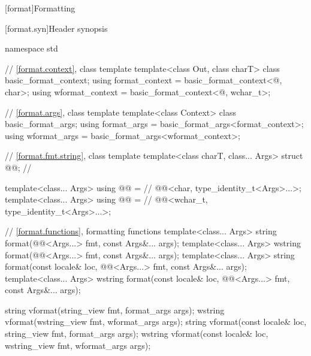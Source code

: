 
[format]{Formatting}

[format.syn]{Header  synopsis}

%
%
%
%
%
%
%
%
%
%
%
\begin{codeblock}
namespace std {
  // \ref{format.context}, class template 
  template<class Out, class charT> class basic_format_context;
  using format_context = basic_format_context<@\unspec@, char>;
  using wformat_context = basic_format_context<@\unspec@, wchar_t>;

  // \ref{format.args}, class template 
  template<class Context> class basic_format_args;
  using format_args = basic_format_args<format_context>;
  using wformat_args = basic_format_args<wformat_context>;

  // \ref{format.fmt.string}, class template 
  template<class charT, class... Args>
    struct @@;                       // \expos

  template<class... Args>
    using @@ =                             // \expos
      @@<char, type_identity_t<Args>...>;
  template<class... Args>
    using @@ =                            // \expos
      @@<wchar_t, type_identity_t<Args>...>;

  // \ref{format.functions}, formatting functions
  template<class... Args>
    string format(@@<Args...> fmt, const Args&... args);
  template<class... Args>
    wstring format(@@<Args...> fmt, const Args&... args);
  template<class... Args>
    string format(const locale& loc, @@<Args...> fmt, const Args&... args);
  template<class... Args>
    wstring format(const locale& loc, @@<Args...> fmt, const Args&... args);

  string vformat(string_view fmt, format_args args);
  wstring vformat(wstring_view fmt, wformat_args args);
  string vformat(const locale& loc, string_view fmt, format_args args);
  wstring vformat(const locale& loc, wstring_view fmt, wformat_args args);

}
\end{codeblock}
